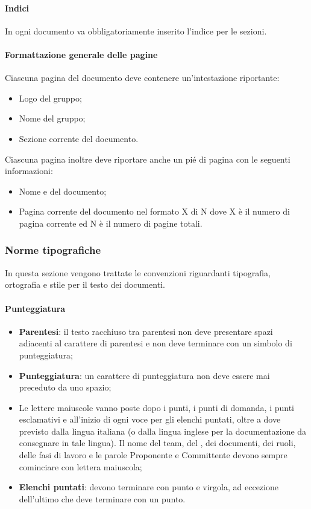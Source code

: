   \paragraph*{Indici}
  In ogni documento va obbligatoriamente inserito l'indice per le sezioni. 

  \paragraph*{Formattazione generale delle pagine}
  Ciascuna pagina del documento deve contenere un'intestazione riportante:
  \begin{itemize}
  \item Logo del gruppo;
  \item Nome del gruppo;
  \item Sezione corrente del documento.
  \end{itemize}
  Ciascuna pagina inoltre deve riportare anche un pi\'e di pagina con le seguenti informazioni:
  \begin{itemize}
  \item Nome e  del documento;
  \item Pagina corrente del documento nel formato X di N dove X è il numero di pagina corrente ed N è il numero di pagine totali.
  \end{itemize}

\subsubsection{Norme tipografiche}
In questa sezione vengono trattate le convenzioni riguardanti tipografia, ortografia e stile per il testo dei documenti.
\paragraph*{Punteggiatura}
\begin{itemize}
\item \textbf{Parentesi}: il testo racchiuso tra parentesi non deve presentare spazi adiacenti al carattere di parentesi e non deve terminare con un simbolo di punteggiatura;
\item \textbf{Punteggiatura}: un carattere di punteggiatura non deve essere mai preceduto da uno spazio;
\item Le lettere maiuscole vanno poste dopo i punti, i punti di domanda, i punti esclamativi e all'inizio di ogni voce per gli elenchi puntati, oltre a dove previsto dalla lingua italiana (o dalla lingua inglese per la documentazione da consegnare in tale lingua). Il nome del team, del , dei documenti, dei ruoli, delle fasi di lavoro e le parole Proponente e Committente devono sempre cominciare con lettera maiuscola;
  \item \textbf{Elenchi puntati}: devono terminare con punto e virgola, ad eccezione dell'ultimo che deve terminare con un punto.
\end{itemize}

